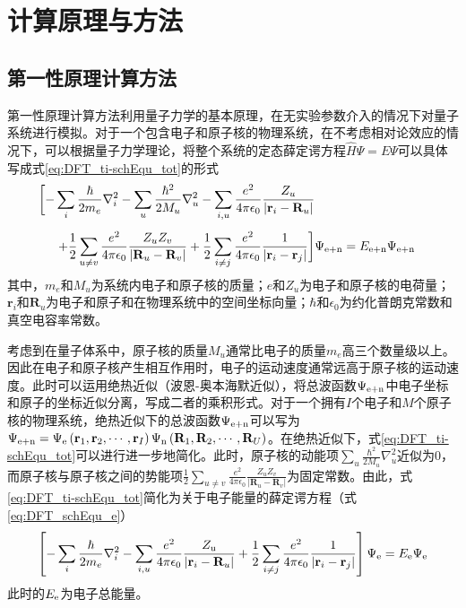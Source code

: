 \chapter{计算原理与方法}
\section{第一性原理计算方法}
第一性原理计算方法利用量子力学的基本原理，在无实验参数介入的情况下对量子系统进行模拟。对于一个包含电子和原子核的物理系统，在不考虑相对论效应的情况下，可以根据量子力学理论，将整个系统的定态薛定谔方程$\hat{H}\Psi =E\Psi$可以具体写成式\eqref{eq:DFT_ti-schEqu_tot}的形式\chinesecolon
\begin{equation}
    \label{eq:DFT_ti-schEqu_tot}
    \begin{split}
        \biggl[-\sum_{i} \frac{\hbar}{2m_e}\nabla_i^2-\sum_{u} \frac{\hbar^2}{2M_u}\nabla_u^2-\sum_{i,u}\frac{e^2}{4\pi\epsilon_0}\frac{Z_u}{\left\lvert {\mathbf r}_i - {\mathbf R}_u \right\rvert } \biggr. \\[+1ex]
        \biggl.+\frac{1}{2} \sum_{u\neq v}\frac{e^2}{4\pi\epsilon_0}\frac{Z_uZ_v}{\left\lvert {\mathbf R}_u-{\mathbf R}_v\right\rvert} + \frac{1}{2}\sum_{i\neq j}\frac{e^2}{4\pi\epsilon_0} \frac{1}{\left\lvert {\mathbf r}_i - {\mathbf r}_j \right\rvert} \biggr]&\Psi_{\rm e+n}=E_{\rm e+n}\Psi_{\rm e+n}
    \end{split}
\end{equation}
其中，$m_e$和$M_u$为系统内电子和原子核的质量；$e$和$Z_u$为电子和原子核的电荷量；${\bm r}_i$和${\bm R}_u$为电子和原子和在物理系统中的空间坐标向量；$\hbar$和$\epsilon_0$为约化普朗克常数和真空电容率常数。

考虑到在量子体系中，原子核的质量$M_u$通常比电子的质量$m_e$高三个数量级以上。因此在电子和原子核产生相互作用时，电子的运动速度通常远高于原子核的运动速度。此时可以运用绝热近似（波恩-奥本海默近似），将总波函数$\Psi_{\rm e+n}$中电子坐标和原子的坐标近似分离，写成二者的乘积形式。对于一个拥有$I$个电子和$M$个原子核的物理系统，绝热近似下的总波函数$\Psi_{\rm e+n}$可以写为\chinesecolon $\Psi_{\rm e+n}=\Psi_{\rm e}\left({\mathbf r}_1,{\mathbf r}_2,\cdots,{\mathbf r}_I\right)\Psi_{\rm n}\left({\mathbf R}_1,{\mathbf R}_2,\cdots,{\mathbf R}_U\right)$。在绝热近似下，式\eqref{eq:DFT_ti-schEqu_tot}可以进行进一步地简化。此时，原子核的动能项$\sum_{u} \frac{\hbar^2}{2M_u}\nabla_u^2$近似为0，而原子核与原子核之间的势能项$ \frac{1}{2} \sum_{u\neq v}\frac{e^2}{4\pi\epsilon_0}\frac{Z_uZ_v}{\left\lvert {\bm R}_u-{\bm R}_v\right\rvert}$为固定常数。由此，式\eqref{eq:DFT_ti-schEqu_tot}简化为关于电子能量的薛定谔方程（式\eqref{eq:DFT_schEqu_e}）\chinesecolon
\begin{equation}
    \label{eq:DFT_schEqu_e}
    \left[-\sum_{i}\frac{\hbar}{2m_e}\nabla_i^2 -\sum_{i,u}\frac{e^2}{4\pi\epsilon_0}\frac{Z_{\rm u}}{\left\lvert{\mathbf r}_i - {\mathbf R}_u\right\rvert} + \frac{1}{2}\sum_{i\neq j}\frac{e^2}{4\pi\epsilon_0} \frac{1}{\left\lvert {\mathbf r}_i - {\mathbf r}_j \right\rvert} \right]\Psi_{\rm e}=E_{\rm e}\Psi_{\rm e}
\end{equation}
此时的$E_{\rm e}$为电子总能量。

